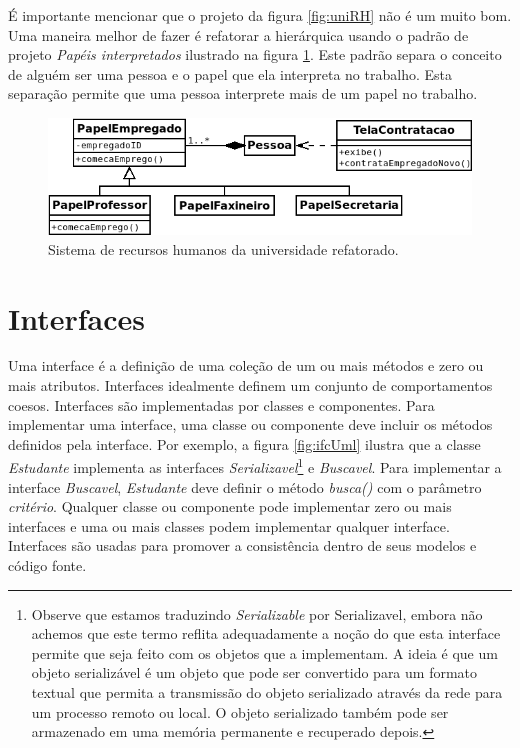 É importante mencionar que o projeto da figura \ref{fig:uniRH} não é um muito bom. Uma maneira melhor de fazer é refatorar a hierárquica usando o padrão de projeto \emph{Papéis interpretados} ilustrado na figura \ref{fig:uniRH2}. Este padrão separa o conceito de alguém ser uma pessoa e o papel que ela interpreta no trabalho. Esta separação permite que uma pessoa interprete mais de um papel no trabalho.

\begin{figure}
\begin{center}
\includegraphics[scale=0.65]{uniRH2.png}
\end{center}
\caption{Sistema de recursos humanos da universidade refatorado.} \label{fig:uniRH2}
\end{figure}

\section{Interfaces}

Uma interface é a definição de uma coleção de um ou mais métodos e zero ou mais atributos. Interfaces idealmente definem um conjunto de comportamentos coesos. Interfaces são implementadas por classes e componentes. Para implementar uma interface, uma classe ou componente deve incluir os métodos definidos pela interface. Por exemplo, a figura \ref{fig:ifcUml} ilustra que a classe \emph{Estudante} implementa as interfaces \emph{Serializavel}\footnote{Observe que estamos traduzindo \emph{Serializable} por Serializavel, embora não achemos que este termo reflita adequadamente a noção do que esta interface permite que seja feito com os objetos que a implementam. A ideia é que um objeto serializável é um objeto que pode ser convertido para um formato textual que permita a  transmissão do objeto serializado através da rede para um processo remoto ou local. O objeto serializado também pode ser armazenado em uma memória permanente e recuperado depois.} e \emph{Buscavel}. Para implementar a interface \emph{Buscavel}, \emph{Estudante} deve definir o método \emph{busca()} com o parâmetro \emph{critério}. Qualquer classe ou componente pode implementar zero ou mais interfaces e uma ou mais classes podem implementar qualquer interface. Interfaces são usadas para promover a consistência dentro de seus modelos e código fonte.


